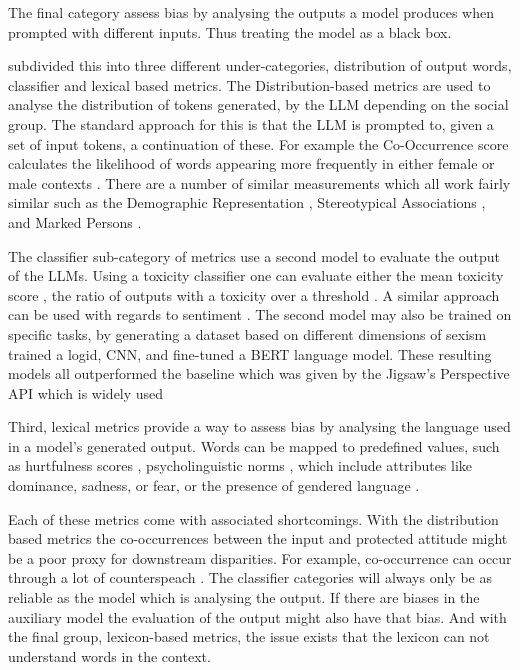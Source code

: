 The final category assess bias by analysing the outputs a model produces when prompted with different inputs. Thus treating the model as a black box.


\citet{gallegos_bias_2024} subdivided this into three different under-categories, distribution of output words, classifier and lexical based metrics. The Distribution-based metrics are used to analyse the distribution of tokens generated, by the LLM depending on the social group. The standard approach for this is that the LLM is prompted to, given a set of input tokens, a continuation of these. For example the Co-Occurrence score calculates the likelihood of words appearing more frequently in either female or male contexts \citep{bordia2019identifying}. There are a number of similar measurements which all work fairly similar such as the Demographic Representation \citep{liang2022holistic}, Stereotypical Associations \citep{liang2022holistic}, and Marked Persons \citep{cheng2023marked}.

The classifier sub-category of metrics use a second model to evaluate the output of the LLMs. Using a toxicity classifier one can evaluate either the mean toxicity score \citep{gehman2020realtoxicityprompts}, the ratio of outputs with a toxicity over a threshold \citep{liang2022holistic}. A similar approach can be used with regards to sentiment \citep{huang2019reducing,sheng2019woman}. The second model may also be trained on specific tasks, by generating a dataset based on different dimensions of sexism \citet{samory2021call} trained a logid, CNN, and fine-tuned a BERT language model. These resulting models all outperformed the baseline which was given by the Jigsaw’s Perspective API \citep{PerspectiveAPI2024} which is widely used  \citep{gehman2020realtoxicityprompts,liang2022holistic}

Third, lexical metrics provide a way to assess bias by analysing the language used in a model's generated output. Words can be mapped to predefined values, such as hurtfulness scores \citep{nozza2021honest}, psycholinguistic norms \citep{dhamala2021bold}, which include attributes like dominance, sadness, or fear, or the presence of gendered language \citep{dhamala2021bold}.

Each of these metrics come with associated shortcomings. With the distribution based metrics the co-occurrences between the input and protected attitude might be a poor proxy for downstream disparities. For example, co-occurrence can occur through a lot of counterspeach \citep{gligoric2024nlp}. The classifier categories will always only be as reliable as the model which is analysing the output. If there are biases in the auxiliary model the evaluation of the output might also have that bias. And with the final group, lexicon-based metrics, the issue exists that the lexicon can not understand words in the context.

